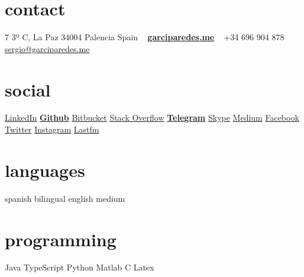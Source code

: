 \documentclass[]{friggeri-cv} %
\begin{document}


    \begin{aside} %

        \section{contact}
            7 3º C, La Paz
            34004 Palencia
            Spain
            ~
            \href{http://garciparedes.me}{\textbf{garciparedes.me}}
            ~
            +34 696 904 878
            \href{mailto:sergio@garciparedes.me}{sergio@garciparedes.me}
        \section{social}
            \href{https://es.linkedin.com/in/garciparedes/en}{LinkedIn\quad\faLinkedin }
            \href{https://github.com/garciparedes}{\textbf{Github}\quad\faGithub }
            \href{https://bitbucket.org/garciparedes/}{Bitbucket\quad\faBitbucket }
            \href{http://stackoverflow.com/users/3921457/garciparedes}{Stack Overflow\quad\faStackOverflow }
            \href{https://telegram.me/garciparedes}{\textbf{Telegram}\quad\faPaperPlane }
            \href{skype:garciparedes?call}{Skype\quad\faSkype }
            \href{https://medium.com/@garciparedes}{Medium\quad\faMedium }
            \href{https://facebook.com/garciparedes}{Facebook\quad\faFacebook}
            \href{https://twitter.com/garciparedes}{Twitter\quad\faTwitter }
            \href{https://www.instagram.com/garciparedes/}{Instagram\quad\faInstagram }
            \href{http://www.last.fm/user/garciparedes/}{Lastfm\quad\faLastfm}
        \section{languages}
            spanish bilingual
            english medium
        \section{programming}
            Java\quad{\color{red} $\varheartsuit\varheartsuit\varheartsuit\varheartsuit\varheartsuit\varheartsuit$}{\color{black} $ $}
            TypeScript\quad{\color{red} $\varheartsuit\varheartsuit\varheartsuit\varheartsuit\varheartsuit$}{\color{black} $\varheartsuit$}
            Python\quad{\color{red} $\varheartsuit\varheartsuit\varheartsuit$}{\color{black} $\varheartsuit\varheartsuit\varheartsuit$}
            Matlab\quad{\color{red} $\varheartsuit\varheartsuit\varheartsuit$}{\color{black} $\varheartsuit\varheartsuit\varheartsuit$}
            C\quad{\color{red} $\varheartsuit\varheartsuit$}{\color{black} $\varheartsuit\varheartsuit\varheartsuit\varheartsuit$}
            Latex\quad{\color{red} $\varheartsuit\varheartsuit\varheartsuit\varheartsuit$}{\color{black} $\varheartsuit\varheartsuit$}

\end{aside}
\end{document}
